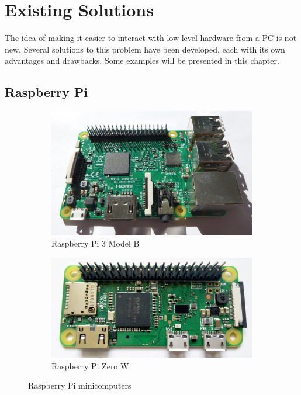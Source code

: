 \chapter{\label{sec:prior-art}Existing Solutions}

The idea of making it easier to interact with low-level hardware from a \gls{PC} is not new. Several solutions to this problem have been developed, each with its own advantages and drawbacks. Some examples will be presented in this chapter.

\section{Raspberry Pi}

\begin{figure}[H]
	\centering
	\begin{subfigure}{.5\textwidth}
		\centering
		\includegraphics[width=.95\textwidth] {img/pi3-photo.jpg}
		\caption{Raspberry Pi 3 Model B}
	\end{subfigure}%
	\begin{subfigure}{.5\textwidth}
		\centering
		\includegraphics[width=.95\textwidth] {img/pi0.jpg}
		\caption{Raspberry Pi Zero W}
	\end{subfigure}
	\caption{\label{fig:rpi}Raspberry Pi minicomputers}
\end{figure}

